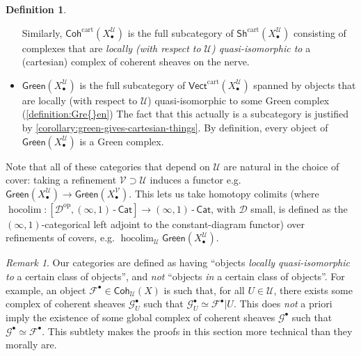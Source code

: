 \documentclass[11pt,fleqn]{article}
\theoremstyle{plain}
\theoremstyle{definition}
\newtheorem{definition}[theorem]{Definition}
\theoremstyle{remark}
\newtheorem{remark}[theorem]{Remark}
\numberwithin{equation}{theorem}
\newcommand{\cover}{\mathcal{U}}
\newcommand{\anothercover}{\mathcal{V}}
\newcommand{\restricted}{\mathbin{\big\vert}}
\newcommand{\infcat}{(\infty,1)\,\text{-}\,\mathsf{Cat}}
\newcommand{\gcohUX}{\mathsf{Coh}_{\cover}(X)}
\newcommand{\gccohX}{\mathsf{CCoh}(X)}
\newcommand{\cartvectX}{\mathsf{Vect}^\mathrm{cart}(X_\bullet^\cover)}
\newcommand{\cartcohX}{\mathsf{Coh}^\mathrm{cart}(X_\bullet^\cover)}
\newcommand{\cartshX}{\mathsf{Sh}^\mathrm{cart}(X_\bullet^\cover)}
\newcommand{\greenX}{\mathsf{Green}(X_\bullet^\cover)}
\newcommand{\greenVX}{\mathsf{Green}(X_\bullet^\anothercover)}
\DeclareMathOperator{\hocolim}{hocolim}
\begin{document}
\begin{definition}
\begin{itemize}
\[                    \]
                    Similarly, $\cartcohX$ is the full subcategory of $\cartshX$ consisting of complexes that are \emph{locally (with respect to $\cover$) quasi-isomorphic to} a (cartesian) complex of coherent sheaves on the nerve.
                \item $\greenX$ is the full subcategory of $\cartvectX$ spanned by objects that are locally (with respect to $\cover$) quasi-isomorphic to some Green complex (\cref{definition:Gre{}en})
                    The fact that this actually is a subcategory is justified by \cref{corollary:green-gives-cartesian-things}.
                    By definition, every object of $\greenX$ is a Gre{}en complex.
            \end{itemize}

            Note that all of these categories that depend on $\cover$ are natural in the choice of cover: taking a refinement $\anothercover\supset\cover$ induces a functor e.g. $\greenX\to\greenVX$.
            This lets us take homotopy colimits (where $\hocolim\colon[\mathcal{D}^\mathrm{op},\infcat]\to\infcat$, with $\mathcal{D}$ small, is defined as the $(\infty,1)$-categorical left adjoint to the constant-diagram functor) over refinements of covers, e.g. $\hocolim_\cover\greenX$.
        \end{definition}

        \begin{remark}\label{remark:subcats-are-locally-q-iso-to}
            Our categories are defined as having ``objects \emph{locally quasi-isomorphic to} a certain class of objects'', and \emph{not} ``objects \emph{in} a certain class of objects''.
            For example, an object $\mathscr{F}^\bullet\in\gcohUX$ is such that, for all $U\in\cover$, there exists some complex of coherent sheaves $\mathscr{G}_U^\bullet$ such that $\mathscr{G}_U^\bullet\simeq \mathscr{F}^\bullet\restricted U$.
            This does \emph{not} a priori imply the existence of some global complex of coherent sheaves $\mathscr{G}^\bullet$ such that $\mathscr{G}^\bullet\simeq\mathscr{F}^\bullet$.
            This subtlety makes the proofs in this section more technical than they morally are.
        \end{remark}
\end{document}
